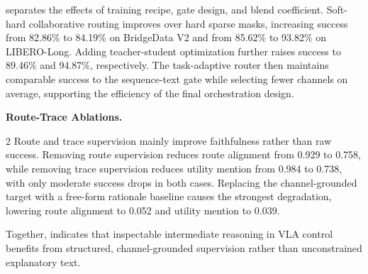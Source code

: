  separates the effects of training recipe, gate design, and blend coefficient. Soft-hard collaborative routing improves over hard sparse masks, increasing success from 82.86\% to 84.19\% on BridgeData V2 and from 85.62\% to 93.82\% on LIBERO-Long. Adding teacher-student optimization further raises success to 89.46\% and 94.87\%, respectively. The task-adaptive router then maintains comparable success to the sequence-text gate while selecting fewer channels on average, supporting the efficiency of the final orchestration design.




\noindent\textbf{Route-Trace Ablations.}
\begin{multicols}{2}
Route and trace supervision mainly improve faithfulness rather than raw success. Removing route supervision reduces route alignment from 0.929 to 0.758, while removing trace supervision reduces utility mention from 0.984 to 0.738, with only moderate success drops in both cases. Replacing the channel-grounded target with a free-form rationale baseline causes the strongest degradation, lowering route alignment to 0.052 and utility mention to 0.039.

\columnbreak

\noindent\begin{minipage}{\columnwidth}
\centering
\scriptsize
\setlength{\tabcolsep}{2pt}
\label{tab:trace_ablation_appendix}
\end{minipage}
\end{multicols}

Together,  indicates that inspectable intermediate reasoning in VLA control benefits from structured, channel-grounded supervision rather than unconstrained explanatory text.
